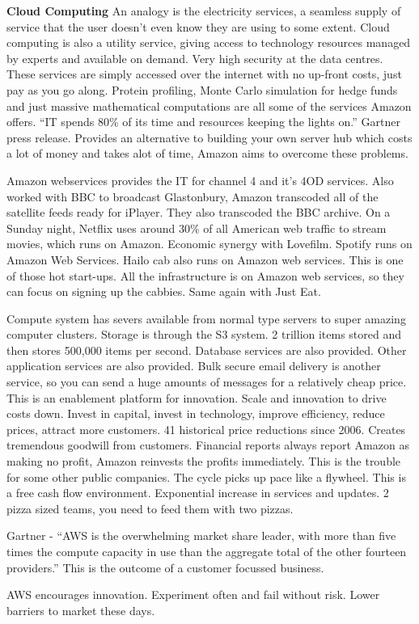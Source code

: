 \textbf{Cloud Computing}
An analogy is the electricity services, a seamless supply of service that the user doesn't even know they are using to some extent. Cloud computing is also a utility service, giving access to technology resources managed by experts and available on demand. Very high security at the data centres. These services are simply accessed over the internet with no up-front costs, just pay as you go along. Protein profiling, Monte Carlo simulation for hedge funds and just massive mathematical computations are all some of the services Amazon offers. ``IT spends 80\% of its time and resources keeping the lights on.'' Gartner press release. Provides an alternative to building your own server hub which costs a lot of money and takes alot of time, Amazon aims to overcome these problems.

Amazon webservices provides the IT for channel 4 and it's 4OD services. Also worked with BBC to broadcast Glastonbury, Amazon transcoded all of the satellite feeds ready for iPlayer. They also transcoded the BBC archive. On a Sunday night, Netflix uses around 30\% of all American web traffic to stream movies, which runs on Amazon. Economic synergy with Lovefilm. Spotify runs on Amazon Web Services. Hailo cab also runs on Amazon web services. This is one of those hot start-ups. All the infrastructure is on Amazon web services, so they can focus on signing up the cabbies. Same again with Just Eat.

Compute system has severs available from normal type servers to super amazing computer clusters.
Storage is through the S3 system. 2 trillion items stored and then stores 500,000 items per second.
Database services are also provided.
Other application services are also provided.
Bulk secure email delivery is another service, so you can send a huge amounts of messages for a relatively cheap price.
This is an enablement platform for innovation.
Scale and innovation to drive costs down. Invest in capital, invest in technology, improve efficiency, reduce prices, attract more customers. 41 historical price reductions since 2006. Creates tremendous goodwill from customers. Financial reports always report Amazon as making no profit, Amazon reinvests the profits immediately. This is the trouble for some other public companies. The cycle picks up pace like a flywheel. This is a free cash flow environment. Exponential increase in services and updates. 2 pizza sized teams, you need to feed them with two pizzas. 

Gartner - ``AWS is the overwhelming market share leader, with more than five times the compute capacity in use than the aggregate total of the other fourteen providers.'' This is the outcome of a customer focussed business. 

AWS encourages innovation. Experiment often and fail without risk. Lower barriers to market these days. 


